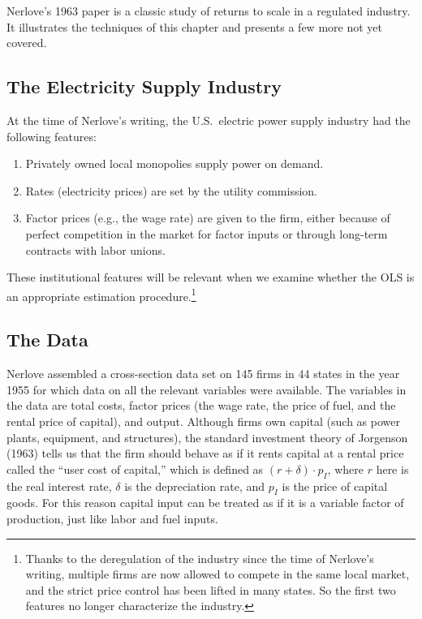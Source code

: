 
Nerlove's 1963 paper is a classic study of returns to scale in a regulated industry.
It illustrates the techniques of this chapter and presents a few more not yet covered.

\subsection*{The Electricity Supply Industry}

At the time of Nerlove's writing, the U.S.\ electric power supply industry had the
following features:
\begin{enumerate}
\item Privately owned local monopolies supply power on demand.
\item Rates (electricity prices) are set by the utility commission.
\item Factor prices (e.g., the wage rate) are given to the firm, either because of
  perfect competition in the market for factor inputs or through long-term contracts
  with labor unions.
\end{enumerate}
These institutional features will be relevant when we examine whether the OLS is an
appropriate estimation procedure.\footnote{Thanks to the deregulation of the industry
since the time of Nerlove's writing, multiple firms are now allowed to compete in the
same local market, and the strict price control has been lifted in many states.  So the
first two features no longer characterize the industry.}

\subsection*{The Data}

Nerlove assembled a cross-section data set on 145 firms in 44 states in the year 1955
for which data on all the relevant variables were available.  The variables in the data
are total costs, factor prices (the wage rate, the price of fuel, and the rental price
of capital), and output.  Although firms own capital (such as power plants, equipment,
and structures), the standard investment theory of Jorgenson (1963) tells us that the
firm should behave as if it rents capital at a rental price called the ``user cost of
capital,'' which is defined as $(r + \delta) \cdot p_I$, where $r$ here is the real
interest rate, $\delta$ is the depreciation rate, and $p_I$ is the price of capital goods.
For this reason capital input can be treated as if it is a variable factor of production,
just like labor and fuel inputs.

